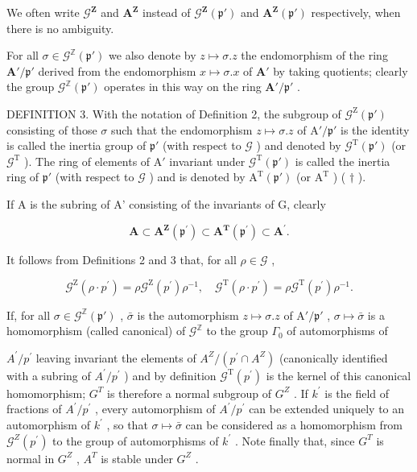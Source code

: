   We often write \(\mathcal{G}^{\mathbf{Z}}\) and \(\mathbf{A}^{\mathbf{Z}}\) instead of \(\mathcal{G}^{\mathbf{Z}}(\mathfrak{p}')\) and \(\mathbf{A}^{\mathbf{Z}}(\mathfrak{p}')\) respectively, when there is no ambiguity.

For all \(\sigma \in \mathcal{G}^{\mathbb{Z}}(\mathfrak{p}')\) we also denote by \(z \mapsto \sigma.z\) the endomorphism of the ring \(\mathbf{A}' / \mathfrak{p}'\) derived from the endomorphism \(x \mapsto \sigma.x\) of \(\mathbf{A}'\) by taking quotients; clearly the group \(\mathcal{G}^{\mathbb{Z}}(\mathfrak{p}')\) operates in this way on the ring \(\mathbf{A}' / \mathfrak{p}'\) .

DEFINITION 3. With the notation of Definition 2, the subgroup of \(\mathcal{G}^{\mathrm{Z}}(\mathfrak{p}')\) consisting of those \(\sigma\) such that the endomorphism \(z \mapsto \sigma.z\) of \(\mathrm{A}' / \mathfrak{p}'\) is the identity is called the inertia group of \(\mathfrak{p}'\) (with respect to \(\mathcal{G}\) ) and denoted by \(\mathcal{G}^{\mathrm{T}}(\mathfrak{p}')\) (or \(\mathcal{G}^{\mathrm{T}}\) ). The ring of elements of \(\mathrm{A}'\) invariant under \(\mathcal{G}^{\mathrm{T}}(\mathfrak{p}')\) is called the inertia ring of \(\mathfrak{p}'\) (with respect to \(\mathcal{G}\) ) and is denoted by \(\mathrm{A}^{\mathrm{T}}(\mathfrak{p}')\) (or \(\mathrm{A}^{\mathrm{T}}\) ) ( \(\dagger\) ).

If A is the subring of A' consisting of the invariants of G, clearly

\[
\mathbf {A} \subset \mathbf {A} ^ {\mathbf {Z}} (\mathfrak {p} ^ {\prime}) \subset \mathbf {A} ^ {\mathbf {T}} (\mathfrak {p} ^ {\prime}) \subset \mathbf {A} ^ {\prime}.\tag{1}
\]

It follows from Definitions 2 and 3 that, for all \(\rho \in \mathcal{G}\) ,

\[
\mathcal {G} ^ {\mathrm{Z}} (\rho \cdot p ^ {\prime}) = \rho \mathcal {G} ^ {\mathrm{Z}} (p ^ {\prime}) \rho^ {- 1}, \quad \mathcal {G} ^ {\mathrm{T}} (\rho \cdot p ^ {\prime}) = \rho \mathcal {G} ^ {\mathrm{T}} (p ^ {\prime}) \rho^ {- 1}.\tag{2}
\]

If, for all \(\sigma \in \mathcal{G}^{\mathbb{Z}}(\mathfrak{p}')\) , \(\bar{\sigma}\) is the automorphism \(z \mapsto \sigma. z\) of \(\mathrm{A}' / \mathfrak{p}'\) , \(\sigma \mapsto \bar{\sigma}\) is a homomorphism (called canonical) of \(\mathcal{G}^{\mathbb{Z}}\) to the group \(\Gamma_0\) of automorphisms of

\(A^{\prime}/p^{\prime}\) leaving invariant the elements of \(A^{Z}/(p^{\prime} \cap A^{Z})\) (canonically identified with a subring of \(A^{\prime}/p^{\prime}\) ) and by definition \(\mathcal{G}^{\mathrm{T}}(p^{\prime})\) is the kernel of this canonical homomorphism; \(G^{T}\) is therefore a normal subgroup of \(G^{Z}\) . If \(k^{\prime}\) is the field of fractions of \(A^{\prime}/p^{\prime}\) , every automorphism of \(A^{\prime}/p^{\prime}\) can be extended uniquely to an automorphism of \(k^{\prime}\) , so that \(\sigma \mapsto \bar{\sigma}\) can be considered as a homomorphism from \(\mathcal{G}^{Z}(p^{\prime})\) to the group of automorphisms of \(k^{\prime}\) . Note finally that, since \(G^{T}\) is normal in \(G^{Z}\) , \(A^{T}\) is stable under \(G^{Z}\) .

